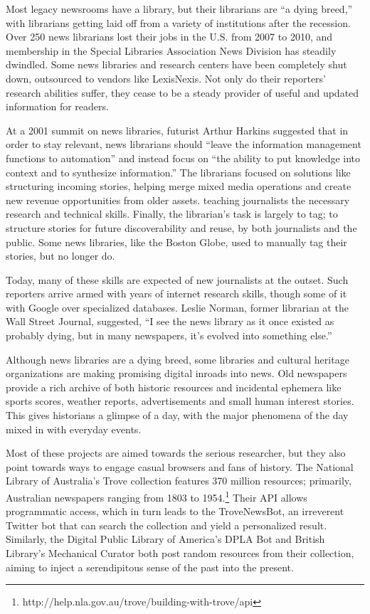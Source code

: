 Most legacy newsrooms have a library, but their librarians are ``a dying breed,'' with librarians getting laid off from a variety of institutions after the recession. Over 250 news librarians lost their jobs in the U.S. from 2007 to 2010, and membership in the Special Libraries Association News Division has steadily dwindled. Some news libraries and research centers have been completely shut down, outsourced to vendors like LexisNexis.\autocite{} Not only do their reporters' research abilities suffer, they cease to be a steady provider of useful and updated information for readers.

At a 2001 summit on news libraries, futurist Arthur Harkins suggested that in order to stay relevant, news librarians should ``leave the information management functions to automation'' and instead focus on ``the ability to put knowledge into context and to synthesize information.'' The librarians focused on solutions like structuring incoming stories, helping merge mixed media operations and create new revenue opportunities from older assets. teaching journalists the necessary research and technical skills. Finally, the librarian's task is largely to tag; to structure stories for future discoverability and reuse, by both journalists and the public. Some news libraries, like the Boston Globe, used to manually tag their stories, but no longer do.

Today, many of these skills are expected of new journalists at the outset. Such reporters arrive armed with years of internet research skills, though some of it with Google over specialized databases. Leslie Norman, former librarian at the Wall Street Journal, suggested, ``I see the news library as it once existed as probably dying, but in many newspapers, it's evolved into something else.''

Although news libraries are a dying breed, some libraries and cultural heritage organizations are making promising digital inroads into news. Old newspapers provide a rich archive of both historic resources and incidental ephemera like sports scores, weather reports, advertisements and small human interest stories. This gives historians a glimpse of a day, with the major phenomena of the day mixed in with everyday events.

Most of these projects are aimed towards the serious researcher, but they also point towards ways to engage casual browsers and fans of history. The National Library of Australia's Trove collection features 370 million resources; primarily, Australian newspapers ranging from 1803 to 1954.\footnote{http://help.nla.gov.au/trove/building-with-trove/api} Their API allows programmatic access, which in turn leads to the TroveNewsBot, an irreverent Twitter bot that can search the collection and yield a personalized result. Similarly, the Digital Public Library of America's DPLA Bot and British Library's Mechanical Curator both post random resources from their collection, aiming to inject a serendipitous sense of the past into the present.

